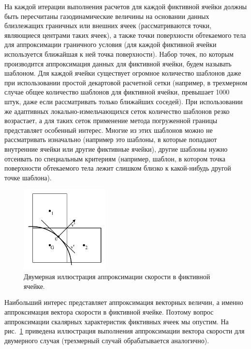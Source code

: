 На каждой итерации выполнения расчетов для каждой фиктивной ячейки должны быть пересчитаны газодинамические величины на основании данных близлежащих граничных или внешних ячеек (рассматриваются точки, являющиеся центрами таких ячеек), а также точки поверхности обтекаемого тела для аппроксимации граничного условия (для каждой фиктивной ячейки используется ближайшая к ней точка поверхности).
Набор точек, по которым производится аппроксимация данных для фиктивной ячейки, будем называть шаблоном.
Для каждой ячейки существует огромное количество шаблонов даже при использовании простой декартовой расчетной сетки (например, в трехмерном случае общее количество шаблонов для фиктивной ячейки, превышает 1000 штук, даже если рассматривать только ближайших соседей).
При использовании же адаптивных локально-измельчающихся сеток \cite{Wackers2011AMR,Zhou2014Refinement,Plas2015Refinement} количество шаблонов резко возрастает, а для таких сеток применение метода погруженной границы представляет особенный интерес.
Многие из этих шаблонов можно не рассматривать изначально (например это шаблоны, в которые попадают внутренние ячейки или другие фиктивные ячейки), другие шаблоны нужно отсеивать по специальным критериям (например, шаблон, в котором точка поверхности обтекаемого тела лежит слишком близко к какой-нибудь другой точке шаблона).

\begin{figure}[ht]
\centering
\includegraphics[width=0.4\textwidth]{./pics/text_1_immersed_boundary_method/3_points_lin_appr_velocity_2d.pdf}
\singlespacing
{}\caption{Двумерная иллюстрация аппроксимации скорости в фиктивной ячейке.}
\label{fig:text_1_immersed_boundary_method_2}
\end{figure}

Наибольший интерес представляет аппроксимация векторных величин, а именно аппроксимация вектора скорости в фиктивной ячейке.
Поэтому вопрос аппроксимации скалярных характеристик фиктивных ячеек мы опустим.
На рис.~\ref{fig:text_1_immersed_boundary_method_2} приведена иллюстрация выполнения аппроксимации вектора скорости для двумерного случая (трехмерный случай обрабатывается аналогично).

